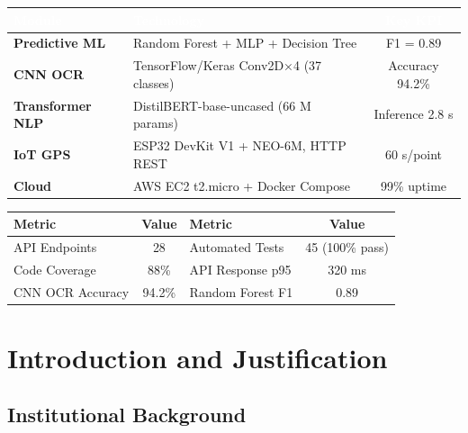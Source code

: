 \documentclass[12pt,a4paper,twoside]{report}
\begin{document}
\begin{center}
\begin{tabularx}{\textwidth}{|>{\bfseries}l|X|c|}
\hline
\rowcolor{tableHdr}\textcolor{white}{\textbf{Module}} &
\textcolor{white}{\textbf{Technology}} &
\textcolor{white}{\textbf{Key KPI}} \\
\hline
\rowcolor{rowOdd}Predictive ML  & Random Forest + MLP + Decision Tree & F1 = 0.89 \\
\hline\rowcolor{rowEven}CNN OCR        & TensorFlow/Keras Conv2D×4 (37 classes) & Accuracy 94.2\% \\
\hline\rowcolor{rowOdd}Transformer NLP & DistilBERT-base-uncased (66 M params) & Inference 2.8 s \\
\hline\rowcolor{rowEven}IoT GPS        & ESP32 DevKit V1 + NEO-6M, HTTP REST & 60 s/point \\
\hline\rowcolor{rowOdd}Cloud          & AWS EC2 t2.micro + Docker Compose & 99\% uptime \\
\hline
\end{tabularx}
\end{center}

\begin{center}
\begin{tabular}{lclc}
\toprule
\textbf{Metric} & \textbf{Value} & \textbf{Metric} & \textbf{Value} \\
\midrule
API Endpoints     & 28     & Automated Tests & 45 (100\% pass) \\
Code Coverage     & 88\%   & API Response p95 & 320 ms \\
CNN OCR Accuracy  & 94.2\% & Random Forest F1 & 0.89 \\
\bottomrule
\end{tabular}
\end{center}

\tableofcontents\newpage
\listoffigures\newpage
\listoftables\newpage

\chapter{Introduction and Justification}

\section{Institutional Background}
\end{document}
